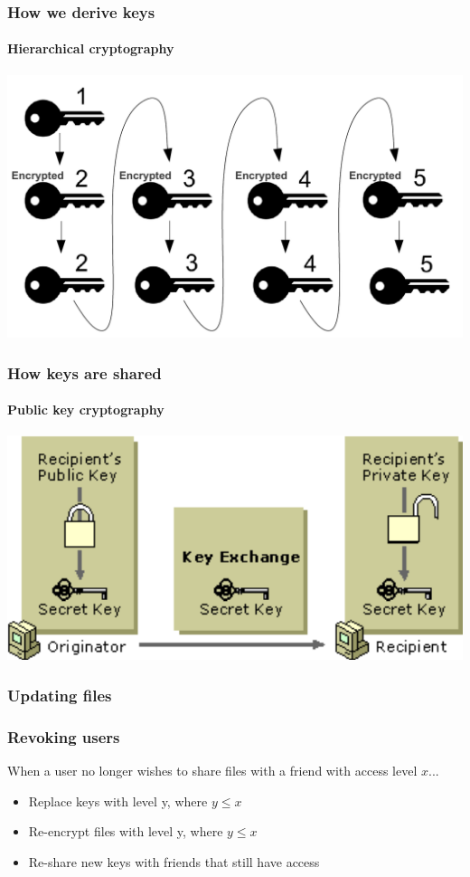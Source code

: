 \documentclass{beamer}
\begin{document}
  
  \begin{frame}
  \frametitle{How we derive keys}
  \framesubtitle{Hierarchical cryptography}
  \begin{center}
  	\includegraphics[scale=0.55]{images/keyDerivation/keyDerivation_scissored.pdf}
  \end{center}
  \end{frame}
  
  \begin{frame}
  	\frametitle{How keys are shared}
  	\framesubtitle{Public key cryptography}
  	\begin{center}
  		\includegraphics[scale=0.65]{images/publicKey/rsaKeyExchange.pdf}
  	\end{center}
  \end{frame}
  
  \begin{frame}
  	\frametitle{Updating files}
  	
  \end{frame}
  
  
  \begin{frame}
	\frametitle{Revoking users}
	When a user no longer wishes to share files with a friend with access level $x$...
	\begin{itemize}
		\item Replace keys with level y, where $y \leq x$
		\item Re-encrypt files with level y, where $y \leq x$
		\item Re-share new keys with friends that still have access
	\end{itemize}
  \end{frame} 
  
\end{document}
